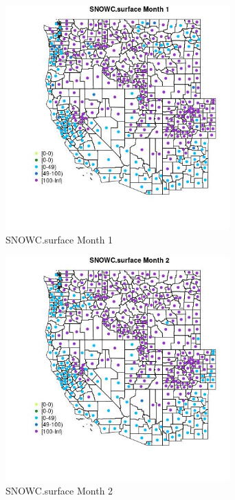 \begin{figure} 
\centering  
\includegraphics[width=0.77\textwidth]{Code_Outputs/df_report_ML_predictors_CountyCentroid_Locations_Dates_2008-01-01to2018-12-31_MapObsMo1SNOWCsurface.jpg} 
\caption{\label{fig:df_report_ML_predictors_CountyCentroid_Locations_Dates_2008-01-01to2018-12-31MapObsMo1SNOWCsurface}SNOWC.surface Month 1} 
\end{figure} 
 

\begin{figure} 
\centering  
\includegraphics[width=0.77\textwidth]{Code_Outputs/df_report_ML_predictors_CountyCentroid_Locations_Dates_2008-01-01to2018-12-31_MapObsMo2SNOWCsurface.jpg} 
\caption{\label{fig:df_report_ML_predictors_CountyCentroid_Locations_Dates_2008-01-01to2018-12-31MapObsMo2SNOWCsurface}SNOWC.surface Month 2} 
\end{figure} 
 


